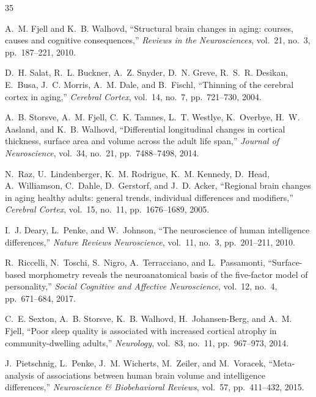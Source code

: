 
\begin{thebibliography}{35}

A.~M. Fjell and K.~B. Walhovd,
``Structural brain changes in aging: courses, causes and cognitive consequences,''
\textit{Reviews in the Neurosciences}, vol.~21, no.~3, pp.~187--221, 2010.

D.~H. Salat, R.~L. Buckner, A.~Z. Snyder, D.~N. Greve, R.~S.~R. Desikan, E.~Busa, J.~C. Morris, A.~M. Dale, and B.~Fischl,
``Thinning of the cerebral cortex in aging,''
\textit{Cerebral Cortex}, vol.~14, no.~7, pp.~721--730, 2004.

A.~B. Storsve, A.~M. Fjell, C.~K. Tamnes, L.~T. Westlye, K.~Overbye, H.~W. Aasland, and K.~B. Walhovd,
``Differential longitudinal changes in cortical thickness, surface area and volume across the adult life span,''
\textit{Journal of Neuroscience}, vol.~34, no.~21, pp.~7488--7498, 2014.

N.~Raz, U.~Lindenberger, K.~M. Rodrigue, K.~M. Kennedy, D.~Head, A.~Williamson, C.~Dahle, D.~Gerstorf, and J.~D. Acker,
``Regional brain changes in aging healthy adults: general trends, individual differences and modifiers,''
\textit{Cerebral Cortex}, vol.~15, no.~11, pp.~1676--1689, 2005.

I.~J. Deary, L.~Penke, and W.~Johnson,
``The neuroscience of human intelligence differences,''
\textit{Nature Reviews Neuroscience}, vol.~11, no.~3, pp.~201--211, 2010.

R.~Riccelli, N.~Toschi, S.~Nigro, A.~Terracciano, and L.~Passamonti,
``Surface-based morphometry reveals the neuroanatomical basis of the five-factor model of personality,''
\textit{Social Cognitive and Affective Neuroscience}, vol.~12, no.~4, pp.~671--684, 2017.

C.~E. Sexton, A.~B. Storsve, K.~B. Walhovd, H.~Johansen-Berg, and A.~M. Fjell,
``Poor sleep quality is associated with increased cortical atrophy in community-dwelling adults,''
\textit{Neurology}, vol.~83, no.~11, pp.~967--973, 2014.

J.~Pietschnig, L.~Penke, J.~M. Wicherts, M.~Zeiler, and M.~Voracek,
``Meta-analysis of associations between human brain volume and intelligence differences,''
\textit{Neuroscience \& Biobehavioral Reviews}, vol.~57, pp.~411--432, 2015.


\end{thebibliography}

